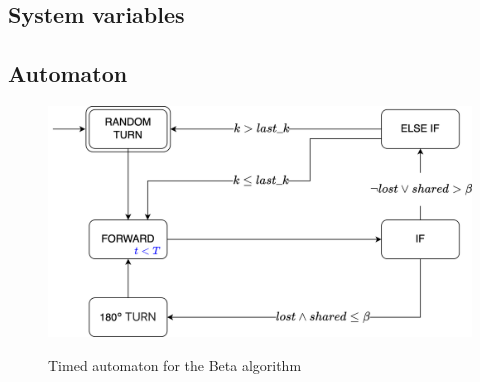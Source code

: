 \subsection{System variables}



\subsection{Automaton}
\begin{figure}[H]
\caption{Timed automaton for the Beta algorithm}
\includegraphics[width=\textwidth]{images/beta.png}
\label{fig:automaton}
\end{figure}
